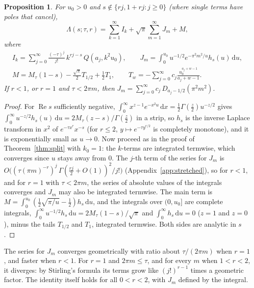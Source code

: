 \documentclass[11pt,reqno]{amsart}
\newtheorem{proposition}[theorem]{Proposition}
\theoremstyle{definition}
\theoremstyle{remark}
\newcommand{\dd}{\,\mathrm{d}}
\begin{document}
\begin{proposition}\label{prop:expsplit}
For $u_0 > 0$ and $s \notin \{rj, 1+rj : j \ge 0\}$ (where single terms have poles that cancel),
\[
  \Lambda(s;\tau,r) = \sum_{k=1}^{\infty}I_k + \sqrt\pi\sum_{m=1}^{\infty}J_m + M,
\]
where
\begin{gather*}
  I_k = \sum_{j=0}^{\infty}\frac{(-\tau)^j}{j!}\,k^{rj-s}\,Q(a_j, k^2u_0), \qquad
  J_m = \int_0^{u_0}u^{-1/2}e^{-\pi^2m^2/u}h_s(u)\dd u, \\
  M = M_\tau(1-s) - \frac{\sqrt\pi}2T_{1/2} + \frac12T_1, \qquad
  T_w = -\sum_{j=0}^{\infty}c_j\frac{u_0^{a_j+w-1}}{a_j+w-1}.
\end{gather*}
If $r < 1$, or $r = 1$ and $\tau < 2\pi m$, then $J_m = \sum_{j=0}^{\infty}c_j\,D_{a_j-1/2}(\pi^2m^2)$.
\end{proposition}

\begin{proof}
For $\operatorname{Re}s$ sufficiently negative, $\int_0^\infty x^{z-1}e^{-x^2u}\dd x = \frac12\Gamma(\frac z2)u^{-z/2}$
gives $\int_0^\infty u^{-z/2}h_s(u)\dd u = 2M_\tau(z-s)/\Gamma(\frac z2)$ in a strip, so $h_s$ is the inverse Laplace
transform in $x^2$ of $e^{-\tau x^r}x^{-s}$ (for $r \le 2$, $y \mapsto e^{-\tau y^{r/2}}$ is completely monotone),
and it is exponentially small as $u \to 0$. Now proceed as in the proof of Theorem~\ref{thm:split} with $k_0 = 1$:
the $k$-terms are integrated termwise, which converges since $u$ stays away from $0$. The $j$-th term of the
series for $J_m$ is $O\bigl((\tau(\pi m)^{-r})^j\,\Gamma(\frac{rj}2+O(1))^2/j!\bigr)$ (Appendix~\ref{app:stretched}),
so for $r < 1$, and for $r = 1$ with $\tau < 2\pi m$, the series of absolute values of the integrals converges and
$J_m$ may also be integrated termwise. The main term is
$M = \int_0^{u_0}(\frac12\sqrt{\pi/u} - \frac12)h_s\dd u$, and the integrals over $(0, u_0]$ are complete integrals,
$\int_0^\infty u^{-1/2}h_s\dd u = 2M_\tau(1-s)/\sqrt\pi$ and $\int_0^\infty h_s\dd u = 0$ ($z = 1$ and $z = 0$), minus
the tails $T_{1/2}$ and $T_1$, integrated termwise. Both sides are analytic in $s$.
\end{proof}

The series for $J_m$ converges geometrically with ratio about $\tau/(2\pi m)$ when $r = 1$, and faster when $r < 1$.
For $r = 1$ and $2\pi m \le \tau$, and for every $m$ when $1 < r < 2$, it diverges: by Stirling's formula its terms
grow like $(j!)^{r-1}$ times a geometric factor. The identity itself holds for all $0 < r < 2$, with $J_m$ defined by
the integral.
\end{document}
